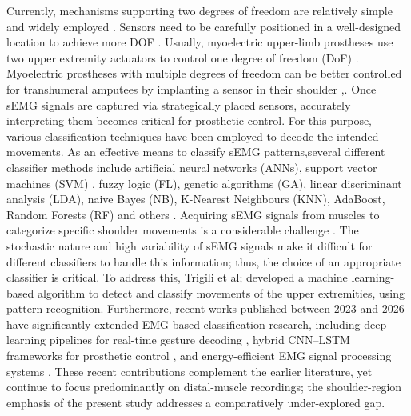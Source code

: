 \documentclass{elektr}
\newcommand{\yh}[1]{#1}
\begin{document}
Currently, mechanisms supporting two degrees of freedom are relatively simple and widely employed \cite{chaobankoh2024classification}. Sensors need to be carefully positioned in a well-designed location to achieve more DOF \cite{jarrasse2016classification}. Usually, myoelectric upper-limb prostheses use two upper extremity actuators to control one degree of freedom (DoF)  \cite{thomson2025myoelectric}. Myoelectric prostheses with multiple degrees of freedom can be better controlled for transhumeral amputees by implanting a sensor in their shoulder \cite{chaobankoh2024classification},\cite{jarrasse2016classification}. Once sEMG signals are captured via strategically placed sensors, accurately interpreting them becomes critical for prosthetic control. For this purpose, various classification techniques have been employed to decode the intended movements. As an effective means to classify sEMG patterns\cite{li2017motion,xie2015comparative,thermalBreastXAI},several different classifier methods include artificial neural networks (ANNs), support vector machines (SVM) \cite {singh2020comparative}, fuzzy logic (FL), genetic algorithms (GA), linear discriminant analysis (LDA), naive Bayes (NB), K-Nearest Neighbours (KNN), AdaBoost, Random Forests (RF) and others \cite{seyidbayli2020comparison}. Acquiring sEMG signals from muscles to categorize specific shoulder movements is a considerable challenge \cite{rani2023surface}. The stochastic nature and high variability of sEMG signals make it difficult for different classifiers to handle this information; thus, the choice of an appropriate classifier is critical\cite{zhang2024improving}. To address this, Trigili et al;\cite{trigili2019detection} developed a machine learning-based algorithm to detect and classify movements of the upper extremities, using pattern recognition. Furthermore, \yh{recent works published between 2023 and 2026 have significantly extended EMG-based classification research, including deep-learning pipelines for real-time gesture decoding} \cite{ref2024_en17112539,ref2024_electronics13173552}\yh{, hybrid CNN--LSTM frameworks for prosthetic control} \cite{ref2025_cmes065098}\yh{, and energy-efficient EMG signal processing systems} \cite{ref2024_en17215412}\yh{. These recent contributions complement the earlier literature, yet continue to focus predominantly on distal-muscle recordings; the shoulder-region emphasis of the present study addresses a comparatively under-explored gap.}\\
\end{document}

